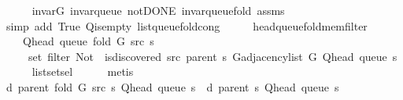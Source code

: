 \begin{isabellebody}
\ \ \ \ \isamarkupfalse%
\ invar{\isacharunderscore}{\kern0pt}G\ invar{\isacharunderscore}{\kern0pt}queue\ not{\isacharunderscore}{\kern0pt}DONE\ invar{\isacharunderscore}{\kern0pt}queue{\isacharunderscore}{\kern0pt}fold{\isacharunderscore}{\kern0pt}{}\ assms\isanewline
\ \ \ \ \isamarkupfalse%
\ {\isacharparenleft}{\kern0pt}simp\ add{\isacharcolon}{\kern0pt}\ True\ Q{\isachardot}{\kern0pt}is{\isacharunderscore}{\kern0pt}empty\ list{\isacharunderscore}{\kern0pt}queue{\isacharunderscore}{\kern0pt}fold{\isacharunderscore}{\kern0pt}cong{\isacharparenright}{\kern0pt}\isanewline
\ \ \isamarkupfalse%
\ \isamarkupfalse%
\ head{\isacharunderscore}{\kern0pt}queue{\isacharunderscore}{\kern0pt}fold{\isacharunderscore}{\kern0pt}mem{\isacharunderscore}{\kern0pt}filter{\isacharcolon}{\kern0pt}\isanewline
\ \ \ \ {\isachardoublequoteopen}Q{\isacharunderscore}{\kern0pt}head\ {\isacharparenleft}{\kern0pt}queue\ {\isacharparenleft}{\kern0pt}fold\ G\ src\ s{\isacharparenright}{\kern0pt}{\isacharparenright}{\kern0pt}\ {\isasymin}\isanewline
\ \ \ \ \ set\ {\isacharparenleft}{\kern0pt}filter\ {\isacharparenleft}{\kern0pt}Not\ {\isasymcirc}\ is{\isacharunderscore}{\kern0pt}discovered\ src\ {\isacharparenleft}{\kern0pt}parent\ s{\isacharparenright}{\kern0pt}{\isacharparenright}{\kern0pt}\ {\isacharparenleft}{\kern0pt}G{\isachardot}{\kern0pt}adjacency{\isacharunderscore}{\kern0pt}list\ G\ {\isacharparenleft}{\kern0pt}Q{\isacharunderscore}{\kern0pt}head\ {\isacharparenleft}{\kern0pt}queue\ s{\isacharparenright}{\kern0pt}{\isacharparenright}{\kern0pt}{\isacharparenright}{\kern0pt}{\isacharparenright}{\kern0pt}{\isachardoublequoteclose}\isanewline
\ \ \ \ \isamarkupfalse%
\ list{\isachardot}{\kern0pt}set{\isacharunderscore}{\kern0pt}sel{\isacharparenleft}{\kern0pt}{}{\isacharparenright}{\kern0pt}\isanewline
\ \ \ \ \isamarkupfalse%
\ metis\isanewline
\isanewline
\ \ \isamarkupfalse%
\ {\isachardoublequoteopen}d\ {\isacharparenleft}{\kern0pt}parent\ {\isacharparenleft}{\kern0pt}fold\ G\ src\ s{\isacharparenright}{\kern0pt}{\isacharparenright}{\kern0pt}\ {\isacharparenleft}{\kern0pt}Q{\isacharunderscore}{\kern0pt}head\ {\isacharparenleft}{\kern0pt}queue\ s{\isacharparenright}{\kern0pt}{\isacharparenright}{\kern0pt}\ {\isacharequal}{\kern0pt}\ d\ {\isacharparenleft}{\kern0pt}parent\ s{\isacharparenright}{\kern0pt}\ {\isacharparenleft}{\kern0pt}Q{\isacharunderscore}{\kern0pt}head\ {\isacharparenleft}{\kern0pt}queue\ s{\isacharparenright}{\kern0pt}{\isacharparenright}{\kern0pt}{\isachardoublequoteclose}\isanewline

\end{isabellebody}
